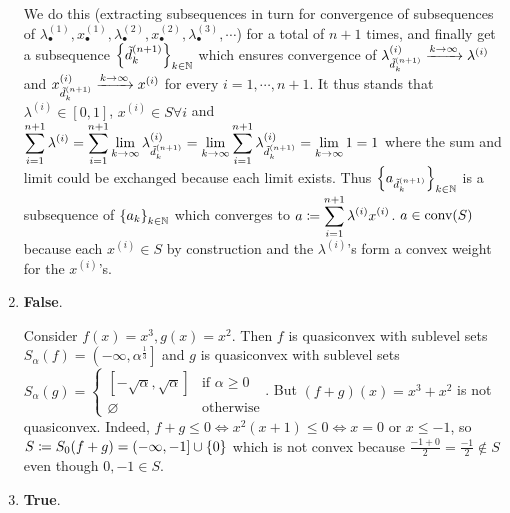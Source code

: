 \begin{enumerate}[leftmargin=*]
We do this (extracting subsequences in turn for convergence of subsequences of $\lambda^{(1)}_{\bullet},x^{(1)}_{\bullet},\lambda^{(2)}_{\bullet}, x^{(2)}_{\bullet}, \lambda^{(3)}_{\bullet},\cdots$) for a total of $n+1$ times, and finally get a subsequence $\left\{{\tilde{d}}^{(n+1)}_{k}\right\}_{{k\in\mathbb{N}}}$ which ensures convergence of $\lambda^{(i)}_{{\tilde{d}}^{(n+1)}_{k}}\xrightarrow{k\to\infty} \lambda^{(i)}$ and $x^{(i)}_{{\tilde{d}}^{(n+1)}_{k}}\xrightarrow{k\to\infty} x^{(i)}$ for every $i=1,\cdots,n+1$. It thus stands that $\lambda^{(i)}\in[0,1]$, $ x^{(i)}\in S\forall i$ and $\displaystyle\sum_{i=1}^{n+1}\lambda^{(i)} = \sum_{i=1}^{n+1}\lim_{{k\to\infty}}\lambda^{(i)}_{{\tilde{d}}^{(n+1)}_{k}} = \lim_{{k\to\infty}}\sum_{i=1}^{n+1}\lambda^{(i)}_{{\tilde{d}}^{(n+1)}_{k}} = \lim_{{k\to\infty}} 1 = 1$ where the sum and limit could be exchanged because each limit exists. Thus $\left\{a_{{\tilde{d}}^{(n+1)}_{k}}\right\}_{k\in\mathbb{N}}$ is a subsequence of $\left\{a_{k}\right\}_{k\in\mathbb{N}}$ which converges to $\displaystyle a\coloneqq \sum_{i=1}^{n+1}\lambda^{(i)}x^{(i)}$. $a\in \text{conv}(S)$ because each $x^{(i)}\in S$ by construction and the $\lambda^{(i)}$'s form a convex weight for the $x^{(i)}$'s.

\item \textbf{False}.

Consider $f(x) = x^{3}, g(x) = x^{2}$. Then $f$ is quasiconvex with sublevel sets $S_{\alpha}(f) = \left(-\infty,\alpha^{\frac13}\right]$ and $g$ is quasiconvex with sublevel sets $S_{\alpha}(g) = \begin{cases}\left[-\sqrt\alpha,\sqrt\alpha\right] &\text{if }\alpha \geq 0\\\varnothing&\text{otherwise}
\end{cases}$. But $(f+g)(x) = x^{3}+x^{2}$ is not quasiconvex. Indeed, $f+g\leq 0\iff x^{2}(x+1)\leq 0\iff x=0\text{ or } x \leq -1$, so $S\coloneqq S_{0}(f+g) = (-\infty,-1]\cup \left\{0\right\}$ which is not convex because $\frac{-1+0}{2} = \frac{-1}{2}\notin S$ even though $0,-1\in S$.

\item \textbf{True}.


\end{enumerate}
